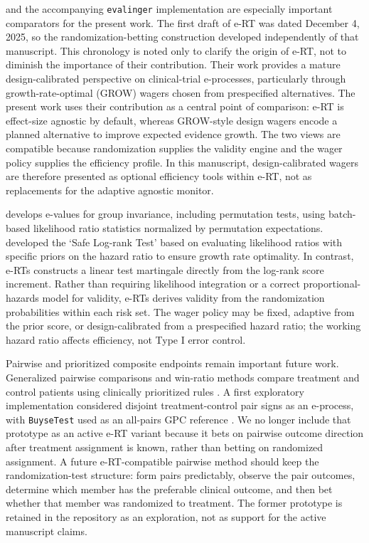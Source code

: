 \documentclass[10pt]{article}
\begin{document}
\citet{sokolova2026evalues} and the accompanying \texttt{evalinger} implementation \citep{evalinger2026} are especially important comparators for the present work. The first draft of e-RT was dated December 4, 2025, so the randomization-betting construction developed independently of that manuscript. This chronology is noted only to clarify the origin of e-RT, not to diminish the importance of their contribution. Their work provides a mature design-calibrated perspective on clinical-trial e-processes, particularly through growth-rate-optimal (GROW) wagers chosen from prespecified alternatives. The present work uses their contribution as a central point of comparison: e-RT is effect-size agnostic by default, whereas GROW-style design wagers encode a planned alternative to improve expected evidence growth. The two views are compatible because randomization supplies the validity engine and the wager policy supplies the efficiency profile. In this manuscript, design-calibrated wagers are therefore presented as optional efficiency tools within e-RT, not as replacements for the adaptive agnostic monitor.

\citet{koning2025} develops e-values for group invariance, including permutation tests, using batch-based likelihood ratio statistics normalized by permutation expectations. \citet{pmlr-v146-grunwald21a} developed the `Safe Log-rank Test' based on evaluating likelihood ratios with specific priors on the hazard ratio to ensure growth rate optimality. In contrast, e-RTs constructs a linear test martingale directly from the log-rank score increment. Rather than requiring likelihood integration or a correct proportional-hazards model for validity, e-RTs derives validity from the randomization probabilities within each risk set. The wager policy may be fixed, adaptive from the prior score, or design-calibrated from a prespecified hazard ratio; the working hazard ratio affects efficiency, not Type I error control.

Pairwise and prioritized composite endpoints remain important future work. Generalized pairwise comparisons and win-ratio methods compare treatment and control patients using clinically prioritized rules \citep{buyse2010gpc, wang2016winratio}. A first exploratory implementation considered disjoint treatment-control pair signs as an e-process, with \texttt{BuyseTest} used as an all-pairs GPC reference \citep{ozenne2025buysetest}. We no longer include that prototype as an active e-RT variant because it bets on pairwise outcome direction after treatment assignment is known, rather than betting on randomized assignment. A future e-RT-compatible pairwise method should keep the randomization-test structure: form pairs predictably, observe the pair outcomes, determine which member has the preferable clinical outcome, and then bet whether that member was randomized to treatment. The former prototype is retained in the repository as an exploration, not as support for the active manuscript claims.
\end{document}
